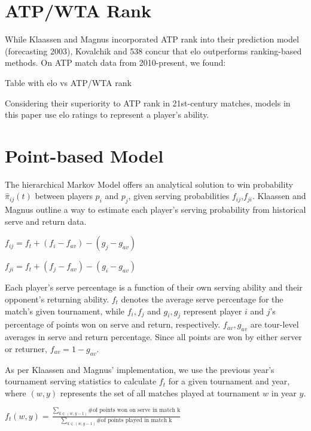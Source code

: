 \documentclass[chapterprefix=false]{report}
\begin{document}
\section{ATP/WTA Rank}
While Klaassen and Magnus incorporated ATP rank into their prediction model (forecasting 2003), Kovalchik and 538 concur that elo outperforms ranking-based methods. On ATP match data from 2010-present, we found:

Table with elo vs ATP/WTA rank

Considering their superiority to ATP rank in 21st-century matches, models in this paper use elo ratings to represent a player's ability.

\section{Point-based Model}
The hierarchical Markov Model offers an analytical solution to win probability $\hat{\pi}_{ij}(t)$ between players $p_i$ and $p_j$, given serving probabilities $f_{ij}$,$f_{ji}$. Klaassen and Magnus outline a way to estimate each player's serving probability from historical serve and return data. 

\begin{center}
$f_{ij} = f_t + (f_i-f_{av})-(g_j-g_{av})$

$f_{ji} = f_t + (f_j-f_{av})-(g_i-g_{av})$
\end{center}

Each player's serve percentage is a function of their own serving ability and their opponent's returning ability. $f_t$ denotes the average serve percentage for the match's given tournament, while $f_i,f_j$ and $g_i,g_j$ represent player $i$ and $j$'s percentage of points won on serve and return, respectively. $f_{av},g_{av}$ are tour-level averages in serve and return percentage. Since all points are won by either server or returner, $f_{av} =1-g_{av}$.

As per Klaassen and Magnus' implementation, we use the previous year's tournament serving statistics to calculate $f_t$ for a given tournament and year, where $(w,y)$ represents the set of all matches played at tournament $w$ in year $y$.

\begin{center}
$f_t(w,y) = \frac{\sum_{k \in (w,y-1)}{\text{\# of points won on serve in match k}}}{\sum_{k \in (w,y-1)}\text{\# of points played in match k}}$
\end{center}
\end{document}
